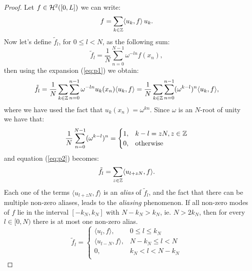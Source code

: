 \begin{proof}
    Let $f\in\mathcal{H}^2([0,L])$ we can write:
    \begin{equation}
        f = \sum_{k\in\mathbb{Z}} \langle u_k,f\rangle\, u_k.
        \label{eq:p1}
    \end{equation}
    Now let's define $\tilde f_l$, for $0\le l < N$, as the following sum:
    \begin{equation}
        \tilde f_l
        = \frac{1}{N} \sum_{n=0}^{N-1} \omega^{-ln} f(x_n),
    \end{equation}
    then using the expansion (\ref{eq:p1}) we obtain:
    \begin{equation}
        \tilde f_l
        = \frac{1}{N} \sum_{k\in\mathbb{Z}}\sum_{n=0}^{n-1} 
            \omega^{-ln} u_{k}(x_n) \langle u_k, f\rangle
        = \frac{1}{N} \sum_{k\in\mathbb{Z}} \sum_{n=0}^{n-1} 
            (\omega^{k-l})^n \langle u_k, f\rangle,
       \label{eq:p2}
    \end{equation}
    where we have used the fact that $u_k(x_n) = \omega^{kn}$.
    Since $\omega$ is an $N$-root of unity we have that:
    \begin{equation}
        \frac{1}{N} \sum_{n=0}^{N-1} 
            (\omega^{k-l})^n  = 
            \begin{cases}
                1, & k-l = zN, z\in\mathbb{Z}\\
                0, & \text{otherwise}
            \end{cases}
    \end{equation}
    and equation (\ref{eq:p2}) becomes:
    \begin{equation}
        \tilde f_l
        = \sum_{z\in\mathbb{Z}} 
           \langle u_{l + zN}, f\rangle.
        \label{eq:aliasing}
    \end{equation}
    Each one of the terms $\langle u_{l+zN},f\rangle$ is an \emph{alias}
    of $\tilde f_l$, and the fact that there can be
    multiple non-zero aliases, leads to the \emph{aliasing} phenomenon.
    If all non-zero modes of $f$ lie in the interval $[-k_N,k_N]$
    with $N-k_N > k_N$, ie. $N > 2k_N$, then for every $l\in [0,N)$
    there is at most one non-zero alias.
    \begin{equation}
        \tilde f_l
        = 
        \begin{cases}
            \langle u_l, f \rangle, & 0\le l \le k_N \\
            \langle u_{l-N}, f \rangle, & N - k_N\le l < N \\
            0, & k_N <  l < N-k_N \\

\end{cases}
\end{equation}
\end{proof}
